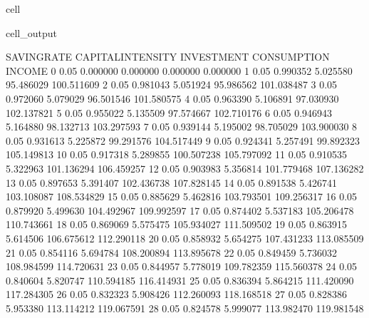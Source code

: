 \documentclass[letterpaper,10pt,english]{jupyterBook}
\begin{document}
\begin{sphinxuseclass}{cell}
\begin{sphinxVerbatimOutput}
\begin{sphinxuseclass}{cell_output}
\begin{sphinxVerbatim}[commandchars=\\\{\}]
    SAVING\PYGZus{}RATE  CAPITAL\PYGZus{}INTENSITY  INVESTMENT  CONSUMPTION      INCOME  
0          0.05           0.000000    0.000000     0.000000    0.000000  
1          0.05           0.990352    5.025580    95.486029  100.511609  
2          0.05           0.981043    5.051924    95.986562  101.038487  
3          0.05           0.972060    5.079029    96.501546  101.580575  
4          0.05           0.963390    5.106891    97.030930  102.137821  
5          0.05           0.955022    5.135509    97.574667  102.710176  
6          0.05           0.946943    5.164880    98.132713  103.297593  
7          0.05           0.939144    5.195002    98.705029  103.900030  
8          0.05           0.931613    5.225872    99.291576  104.517449  
9          0.05           0.924341    5.257491    99.892323  105.149813  
10         0.05           0.917318    5.289855   100.507238  105.797092  
11         0.05           0.910535    5.322963   101.136294  106.459257  
12         0.05           0.903983    5.356814   101.779468  107.136282  
13         0.05           0.897653    5.391407   102.436738  107.828145  
14         0.05           0.891538    5.426741   103.108087  108.534829  
15         0.05           0.885629    5.462816   103.793501  109.256317  
16         0.05           0.879920    5.499630   104.492967  109.992597  
17         0.05           0.874402    5.537183   105.206478  110.743661  
18         0.05           0.869069    5.575475   105.934027  111.509502  
19         0.05           0.863915    5.614506   106.675612  112.290118  
20         0.05           0.858932    5.654275   107.431233  113.085509  
21         0.05           0.854116    5.694784   108.200894  113.895678  
22         0.05           0.849459    5.736032   108.984599  114.720631  
23         0.05           0.844957    5.778019   109.782359  115.560378  
24         0.05           0.840604    5.820747   110.594185  116.414931  
25         0.05           0.836394    5.864215   111.420090  117.284305  
26         0.05           0.832323    5.908426   112.260093  118.168518  
27         0.05           0.828386    5.953380   113.114212  119.067591  
28         0.05           0.824578    5.999077   113.982470  119.981548  
\end{sphinxVerbatim}

\end{sphinxuseclass}\end{sphinxVerbatimOutput}

\end{sphinxuseclass}
\end{document}
